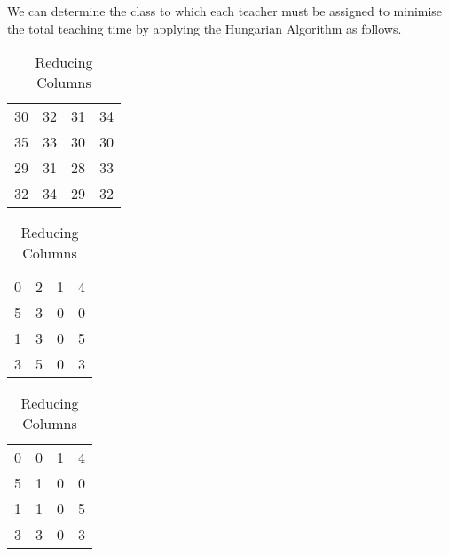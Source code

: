 % 
%
%

\begin{subquestions}
	
\subquestion
	
\begin{subsubquestions}
		
\subsubquestion
		
We can determine the class to which each teacher must be assigned to minimise the total teaching time by applying the Hungarian Algorithm as follows.
		\begin{table}[H]
			\begin{minipage}{0.3\textwidth}
				\centering
				\begin{tabular}{cccc}
					30 & 32 & 31 & 34 \\
					35 & 33 & 30 & 30 \\
					29 & 31 & 28 & 33 \\
					32 & 34 & 29 & 32 \\
				\end{tabular}
				\captionsetup{width=1.1\linewidth}
				\caption*{Matrix From question}
			\end{minipage}
			\hspace{20pt}
			\begin{minipage}{0.3\textwidth}
				\centering
				\begin{tabular}{cccc}
					0 & 2 & 1 & 4 \\
					5 & 3 & 0 & 0 \\
					1 & 3 & 0 & 5 \\
					3 & 5 & 0 & 3 \\
				\end{tabular}
				\captionsetup{width=1.1\linewidth}
				\caption*{Reducing Rows}
			\end{minipage}
			\hspace{20pt}
			\begin{minipage}{0.3\textwidth}
				\centering
				\begin{tabular}{cccc}
					0 & 0 & 1 & 4 \\
					5 & 1 & 0 & 0 \\
					1 & 1 & 0 & 5 \\
					3 & 3 & 0 & 3 \\
				\end{tabular}
				\captionsetup{width=1.1\linewidth}
				\caption*{Reducing Columns} 
			\end{minipage}
			

\end{table}
\end{subsubquestions}
\end{subquestions}

